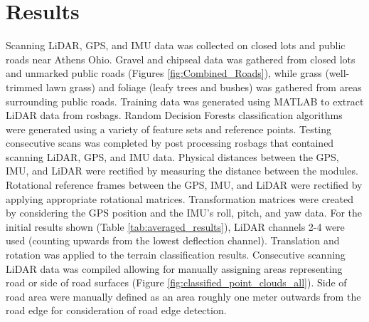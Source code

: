 \documentclass[journal,onecolumn]{IEEEtran}
\begin{document}
	
\section{Results}
	
	{Scanning LiDAR, GPS, and IMU data was collected on closed lots and public roads near Athens Ohio. Gravel and chipseal data was gathered from closed lots and unmarked public roads (Figures \ref{fig:Combined_Roads}), while grass (well-trimmed lawn grass) and foliage (leafy trees and bushes) was gathered from areas surrounding public roads. Training data was generated using MATLAB to extract LiDAR data from rosbags. Random Decision Forests classification algorithms were generated using a variety of feature sets and reference points. Testing consecutive scans was completed by post processing rosbags that contained scanning LiDAR, GPS, and IMU data. Physical distances between the GPS, IMU, and LiDAR were rectified by measuring the distance between the modules. Rotational reference frames between the GPS, IMU, and LiDAR were rectified by applying appropriate rotational matrices. Transformation matrices were created by considering the GPS position and the IMU's roll, pitch, and yaw data. For the initial results shown (Table \ref{tab:averaged_results}), LiDAR channels 2-4 were used (counting upwards from the lowest deflection channel).  Translation and rotation was applied to the terrain classification results. Consecutive scanning LiDAR data was compiled allowing for manually assigning areas representing road or side of road surfaces (Figure \ref{fig:classified_point_clouds_all}). Side of road area were manually defined as an area roughly one meter outwards from the road edge for consideration of road edge detection.}
		
\end{document}
